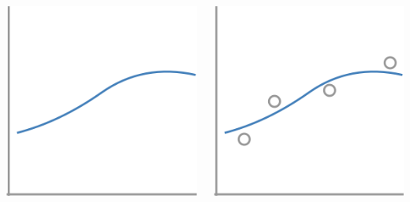 \documentclass[presentation]{subfiles}
\begin{document}
\begin{frame}[t]
\begin{columns}
\begin{column}{0.16\textwidth}
  {\includegraphics[width=\textwidth]{figures/sla_1.png}}


\end{column}

\begin{column}{0.16\textwidth}
{\includegraphics[width=\textwidth]{figures/slb_2.png}}


\end{column}
\end{columns}
\end{frame}
\end{document}
